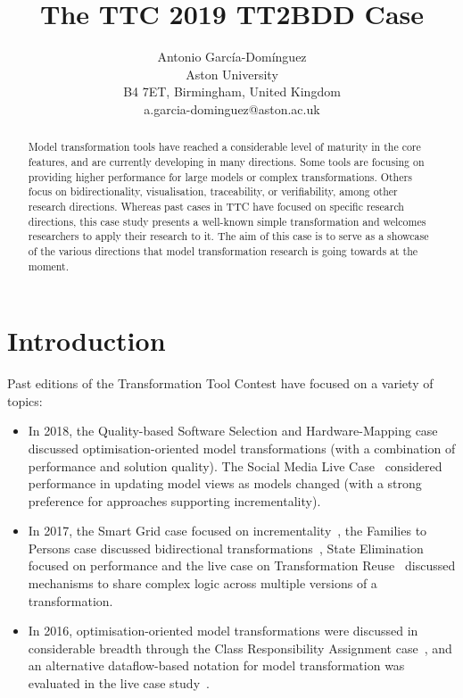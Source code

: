 \documentclass[a4paper]{scrartcl}
\title{The TTC 2019 TT2BDD Case}
\author{
  Antonio García-Domínguez\\
  Aston University\\
  B4 7ET, Birmingham, United Kingdom\\
  a.garcia-dominguez@aston.ac.uk
}
\begin{document}
\maketitle

\begin{abstract}
  Model transformation tools have reached a considerable level of maturity in
  the core features, and are currently developing in many directions. Some tools
  are focusing on providing higher performance for large models or complex
  transformations. Others focus on bidirectionality, visualisation,
  traceability, or verifiability, among other research directions. Whereas past
  cases in TTC have focused on specific research directions, this case study
  presents a well-known simple transformation and welcomes researchers to apply
  their research to it. The aim of this case is to serve as a showcase of the
  various directions that model transformation research is going towards at the
  moment.
\end{abstract}

\section{Introduction}

Past editions of the Transformation Tool Contest have focused on a variety of
topics:
\begin{itemize}
\item In 2018, the Quality-based Software Selection and Hardware-Mapping
  case~\cite{gotz_quality-based_2018} discussed optimisation-oriented model
  transformations (with a combination of performance and solution quality). The
  Social Media Live Case~\cite{hinkel_ttc_2018} considered performance in
  updating model views as models changed (with a strong preference for
  approaches supporting incrementality).

\item In 2017, the Smart Grid case focused on
  incrementality~\cite{hinkel_ttc_2017}, the Families to Persons case discussed
  bidirectional transformations~\cite{anjorin_families_2017}, State Elimination
  focused on performance and the live case on Transformation
  Reuse~\cite{live2017} discussed mechanisms to share complex logic across
  multiple versions of a transformation.

\item In 2016, optimisation-oriented model transformations were discussed in
  considerable breadth through the Class Responsibility Assignment
  case~\cite{fleck_class_2016}, and an alternative dataflow-based notation for
  model transformation was evaluated in the live case study~\cite{live2016}.
\end{itemize}
\end{document}
